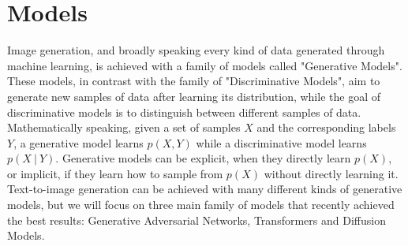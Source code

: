 \documentclass[conference]{IEEEtran}
\begin{document}
\section{Models}
Image generation, and broadly speaking every kind of data generated through machine learning, is achieved with a family of models called "Generative Models". These models, in contrast with the family of "Discriminative Models", aim to generate new samples of data after learning its distribution, while the goal of discriminative models is to distinguish between different samples of data. Mathematically speaking, given a set of samples $X$ and the corresponding labels $Y$, a generative model learns $p(X, Y)$ while a discriminative model learns $p(X\:|\:Y)$. Generative models can be explicit, when they directly learn $p(X)$, or implicit, if they learn how to sample from $p(X)$ without directly learning it.\\
Text-to-image generation can be achieved with many different kinds of generative models, but we will focus on three main family of models that recently achieved the best results: Generative Adversarial Networks, Transformers and Diffusion Models.
\end{document}
